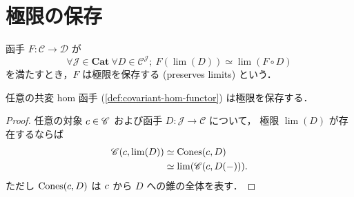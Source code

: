 \documentclass[titlepage]{ltjsreport}
\newcommand{\cat}[1]{\mathscr{#1}}
\newcommand{\obj}[1]{\lowercase{#1}}
\newcommand{\objs}[1]{#1}
\newcommand{\mrp}[3]{{#1}:{#2}\to{#3}}
\newcommand{\mrps}[3]{#1(#2,#3)}
\newcommand{\Cat}{\mathbf{Cat}}
\newcommand{\Fun}[2]{{#2}^{#1}}
\begin{document}
\section{極限の保存}

\begin{definition}[極限の保存]
  \def\C{\cat{C}}%
  \def\D{\cat{D}}%
  \def\f{F}%
  \def\J{\cat{J}}%
  \def\diagram{D}%
  函手 $\mrp{\f}{\C}{\D}$ が
  \begin{equation}
    \forall\J\in\objs{\Cat}\ \forall\diagram\in\Fun{\J}{\C};
    \ \f(\lim(\diagram))\simeq\lim(\f\circ\diagram)
  \end{equation}
  を満たすとき，$\f$ は極限を保存する (preserves limits) という．
\end{definition}

\begin{theorem}\label{thm:hom-functor-preserves-limits}
  任意の共変 hom 函手 (\cref{def:covariant-hom-functor}) は極限を保存する．
\end{theorem}
\begin{proof}
  \def\C{\cat{C}}%
  \def\c{\obj{c}}%
  \def\f{F}%
  \def\J{\cat{J}}%
  \def\diagram{D}%
  任意の対象 $\c\in\objs{\C}$ および函手 $\mrp{\diagram}{\J}{\C}$ について，
  極限 $\lim(\diagram)$ が存在するならば
  \begin{align}
    \mrps{\C}{\c}{\lim(\diagram)}
     & \simeq\operatorname{Cones}(\c,\diagram) \\
     & \simeq\lim(\mrps{\C}{\c}{\diagram(-)}).
  \end{align}
  ただし $\operatorname{Cones}(\c,\diagram)$ は
  $\c$ から $\diagram$ への錐の全体を表す．
\end{proof}
\end{document}
